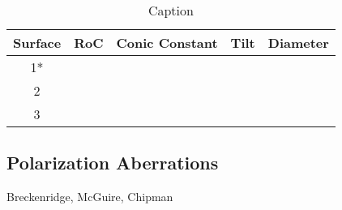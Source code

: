 \begin{table}[H]
    \centering
    \begin{tabular}{c c c c c}
    \hline
        Surface & RoC & Conic Constant & Tilt & Diameter  \\
    \hline
        1* & & & & \\
        2 & & & & \\
        3 & & & & \\
    \hline
    \hline
    \end{tabular}
    \caption{Caption}
    \label{tab:space_prescription}
\end{table}

\subsection{Polarization Aberrations}
Breckenridge, McGuire, Chipman